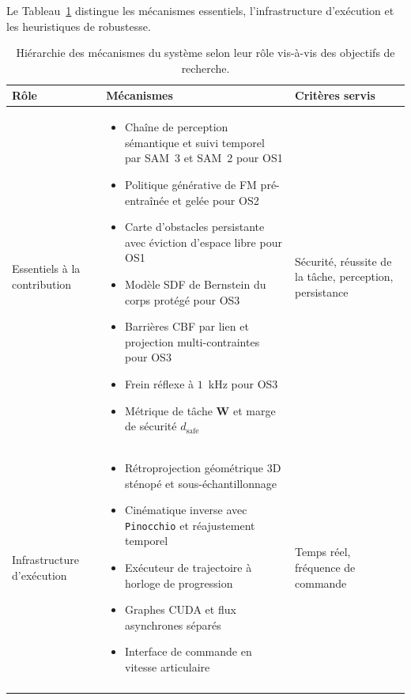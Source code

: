 Le Tableau~\ref{tab:mecanismes} distingue les mécanismes essentiels, l'infrastructure d'exécution et les heuristiques de robustesse.

\begin{table}[htbp]
\centering
\caption{Hiérarchie des mécanismes du système selon leur rôle vis-à-vis des objectifs de recherche.}
\label{tab:mecanismes}
\small
\begin{tabular}{>{\raggedright\arraybackslash}p{3.4cm}>{\raggedright\arraybackslash}p{7.4cm}>{\raggedright\arraybackslash}p{3.8cm}}
\hline
Rôle & Mécanismes & Critères servis \\ \hline
Essentiels à la contribution
& \begin{itemize}[leftmargin=*,noitemsep,topsep=2pt,partopsep=0pt]
    \item Chaîne de perception sémantique et suivi temporel par \ac{SAM}~3 et \ac{SAM}~2 pour \acs{OS}1
    \item Politique générative de \ac{FM} pré-entraînée et gelée pour \acs{OS}2
    \item Carte d'obstacles persistante avec éviction d'espace libre pour \acs{OS}1
    \item Modèle \ac{SDF} de Bernstein du corps protégé pour \acs{OS}3
    \item Barrières \ac{CBF} par lien et projection multi-contraintes pour \acs{OS}3
    \item Frein réflexe à $1$~kHz pour \acs{OS}3
    \item Métrique de tâche $\mathbf{W}$ et marge de sécurité $d_{\mathrm{safe}}$
  \end{itemize}
& Sécurité, réussite de la tâche, perception, persistance \\ \addlinespace[0.4em] \hline \addlinespace[0.4em]
Infrastructure d'exécution
& \begin{itemize}[leftmargin=*,noitemsep,topsep=2pt,partopsep=0pt]
    \item Rétroprojection géométrique 3D sténopé et sous-échantillonnage
    \item Cinématique inverse avec \texttt{Pinocchio} et réajustement temporel
    \item Exécuteur de trajectoire à horloge de progression
    \item Graphes CUDA et flux asynchrones séparés
    \item Interface de commande en vitesse articulaire
  \end{itemize}
& Temps réel, fréquence de commande \\ \addlinespace[0.4em] \hline \addlinespace[0.4em]

\end{tabular}
\end{table}
